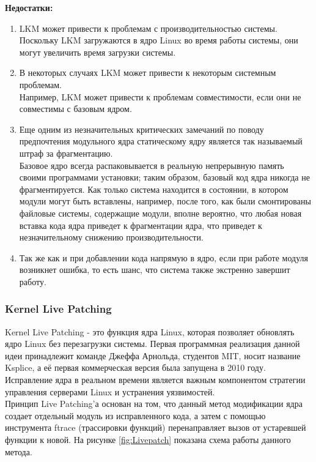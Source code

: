 \textbf{Недостатки:}
\begin{enumerate}
    \item LKM может привести к проблемам с производительностью системы. \vspace{1mm}\\
    Поскольку LKM загружаются в ядро Linux во время работы системы, они могут увеличить время загрузки системы.
    \item В некоторых случаях LKM может привести к некоторым системным проблемам. \vspace{1mm}\\
    Например, LKM может привести к проблемам совместимости, если они не совместимы с базовым ядром.
    \item Еще одним из незначительных критических замечаний по поводу предпочтения модульного ядра статическому ядру является так называемый штраф за фрагментацию. \vspace{1mm}\\
    Базовое ядро всегда распаковывается в реальную непрерывную память своими программами установки;
    таким образом, базовый код ядра никогда не фрагментируется.
    Как только система находится в состоянии, в котором модули могут быть вставлены, например, после того, как были смонтированы файловые системы, содержащие модули, вполне вероятно,
    что любая новая вставка кода ядра приведет к фрагментации ядра, что приведет к незначительному снижению производительности.
    \item Так же как и при добавлении кода напрямую в ядро, если при работе модуля возникнет ошибка, то есть шанс, что система также экстренно завершит работу.
\end{enumerate}

\subsubsection{Kernel Live Patching}\label{subsec:kernel-live-patching}

Kernel Live Patching - это функция ядра Linux, которая позволяет обновлять ядро Linux без перезагрузки системы.
Первая программная реализация данной идеи принадлежит команде Джеффа Арнольда, студентов MIT, носит название Ksplice\cite{ksplice}, а её первая коммерческая версия была запущена в 2010 году.
Исправление ядра в реальном времени является важным компонентом стратегии управления серверами Linux и устранения уязвимостей.
\\
Принцип Live Patching'а основан на том, что данный метод модификации ядра создает отдельный модуль из исправленного кода, а затем с помощью инструмента ftrace (трассировки функций) перенаправляет вызов от устаревшей функции к новой.
На рисунке \ref{fig:Livepatch} показана схема работы данного метода.

